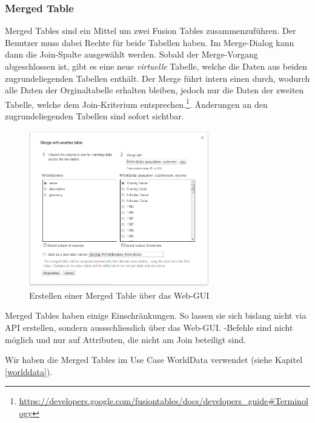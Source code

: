 \subsubsection{Merged Table}
\gls{Merge}d Tables sind ein Mittel um zwei Fusion Tables zusammenzuführen. Der Benutzer muss dabei Rechte für beide Tabellen haben. Im \gls{Merge}-Dialog kann dann die Join-Spalte ausgewählt werden. Sobald der \gls{Merge}-Vorgang abgeschlossen ist, gibt es eine neue \emph{virtuelle} Tabelle, welche die Daten aus beiden zugrundeliegenden Tabellen enthält. Der \gls{Merge} führt intern einen  durch, wodurch alle Daten der Orginaltabelle erhalten bleiben, jedoch nur die Daten der zweiten Tabelle, welche dem Join-Kriterium entsprechen.\footnote{ \url{https://developers.google.com/fusiontables/docs/developers_guide\#Terminology}}. Änderungen an den zugrundeliegenden Tabellen sind sofort sichtbar.

\begin{figure}[!ht]
	\centering
	\includegraphics[width=0.7\textwidth]{images/usecase1-worlddata/documentation/worlddata-merge2}
	\caption{Erstellen einer \gls{Merge}d Table über das Web-GUI}
	\label{create-merge-table}
\end{figure}

\gls{Merge}d Tables haben einige Einschränkungen. So lassen sie sich bislang nicht via API erstellen, sondern aussschliesslich über das Web-GUI. -Befehle sind nicht möglich und  nur auf Attributen, die nicht am Join beteiligt sind.

Wir haben die \gls{Merge}d Tables im Use Case WorldData verwendet (siehe Kapitel \ref{worlddata}).

